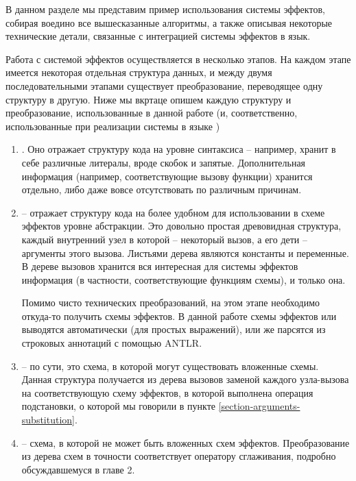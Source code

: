 В данном разделе мы представим пример использования системы эффектов, собирая воедино все вышесказанные алгоритмы, а также описывая некоторые технические детали, связанные с интеграцией системы эффектов в язык.

Работа с системой эффектов осуществляется в несколько этапов. На каждом этапе имеется некоторая отдельная структура данных, и между двумя последовательными этапами существует преобразование, переводящее одну структуру в другую. Ниже мы вкртаце опишем каждую структуру и преобразование, использованные в данной работе (и, соответственно, использованные при реализации системы в языке )

\begin{enumerate}
  \item {}. Оно отражает структуру кода на уровне синтаксиса -- например, хранит в себе различные литералы, вроде скобок и запятые. Дополнительная информация (например, соответствующие вызову функции) хранится отдельно, либо даже вовсе отсутствовать по различным причинам.

  \item {} -- отражает структуру кода на более удобном для использовании в схеме эффектов уровне абстракции. Это довольно простая древовидная структура, каждый внутренний узел в которой -- некоторый вызов, а его дети -- аргументы этого вызова. Листьями дерева являются константы и переменные. В дереве вызовов хранится вся интересная для системы эффектов информация (в частности, соответствующие функциям схемы), и только она.

  Помимо чисто технических преобразований, на этом этапе необходимо откуда-то получить схемы эффектов. В данной работе схемы эффектов или выводятся автоматически (для простых выражений), или же парсятся из строковых аннотаций с помощью ANTLR.

  \item {} -- по сути, это схема, в которой могут существовать вложенные схемы. Данная структура получается из дерева вызовов заменой каждого узла-вызова на соответствующую схему эффектов, в которой выполнена операция подстановки, о которой мы говорили в пункте \ref{section-arguments-substitution}.

  \item {} -- схема, в которой не может быть вложенных схем эффектов. Преобразование из дерева схем в точности соответствует оператору сглаживания, подробно обсуждавшемуся в главе 2.


\end{enumerate}

